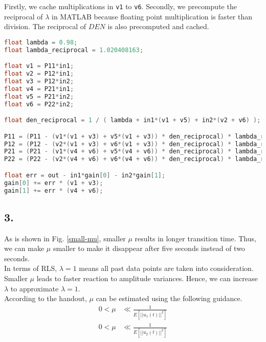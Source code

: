\documentclass{article}
\begin{document}
Firstly, we cache multiplications in \texttt{v1} to \texttt{v6}. Secondly, we precompute the reciprocal of $\lambda$ in MATLAB because floating point multiplication is faster than division. The reciprocal of $DEN$ is also precomputed and cached.

\begin{lstlisting}[language={C}]
float lambda = 0.98;
float lambda_reciprocal = 1.020408163;

float v1 = P11*in1;
float v2 = P12*in1;
float v3 = P12*in2;
float v4 = P21*in1;
float v5 = P21*in2;
float v6 = P22*in2;

float den_reciprocal = 1 / ( lambda + in1*(v1 + v5) + in2*(v2 + v6) );

P11 = (P11 - (v1*(v1 + v3) + v5*(v1 + v3)) * den_reciprocal) * lambda_reciprocal;
P12 = (P12 - (v2*(v1 + v3) + v6*(v1 + v3)) * den_reciprocal) * lambda_reciprocal;
P21 = (P21 - (v1*(v4 + v6) + v5*(v4 + v6)) * den_reciprocal) * lambda_reciprocal;
P22 = (P22 - (v2*(v4 + v6) + v6*(v4 + v6)) * den_reciprocal) * lambda_reciprocal;

float err = out - in1*gain[0] - in2*gain[1];
gain[0] += err * (v1 + v3);
gain[1] += err * (v4 + v6);
\end{lstlisting}

\subsection*{3.}
As is shown in Fig. \ref{small-mu}, smaller $\mu$ results in longer transition time. Thus, we can make $\mu$ smaller to make it disappear after five seconds instead of two seconds.\\

In terms of RLS, $\lambda = 1$ means all past data points are taken into consideration. Smaller $\mu$ leads to faster reaction to amplitude variances. Hence, we can increase $\lambda$ to approximate $\lambda = 1$.\\

According to the handout, $\mu$ can be estimated using the following guidance.
\begin{align*}
0 < \mu &\ll \frac{1}{E[||u_1(t)||^2]}\\
0 < \mu &\ll \frac{1}{E[||u_2(t)||^2]}
\end{align*}

\end{document}
